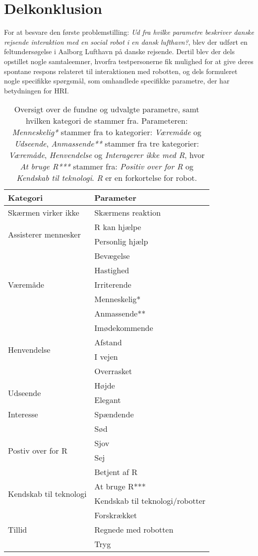 \chapter{Delkonklusion}
\label{ParametreDelKonklusion}
%
For at besvare den første problemstilling: \textit{Ud fra hvilke parametre beskriver danske rejsende interaktion med en social robot i en dansk lufthavn?}, blev der udført en feltundersøgelse i Aalborg Lufthavn på danske rejsende. Dertil blev der dels opstillet nogle samtaleemner, hvorfra testpersonerne fik mulighed for at give deres spontane respons relateret til interaktionen med robotten, og dels formuleret nogle specifikke spørgsmål, som omhandlede specifikke parametre, der har betydningen for HRI. 
%
\begin{table}[H]
\centering
\begin{tabular}{ l|l }
\centering
Kategori & Parameter\\ \hline
Skærmen virker ikke & Skærmens reaktion\\ \hline
\multirow{2}{*}{Assisterer mennesker} & R kan hjælpe \\
 & Personlig hjælp \\ \hline
\multirow{5}{*}{Væremåde} & Bevægelse \\
 & Hastighed \\
 & Irriterende \\
 & Menneskelig* \\
 & Anmassende** \\ \hline
\multirow{4}{*}{Henvendelse} & Imødekommende \\
 & Afstand \\
 & I vejen \\
 & Overrasket\\ \hline
 \multirow{2}{*}{Udseende} & Højde \\
 & Elegant \\ \hline
 Interesse & Spændende\\ \hline
 \multirow{4}{*}{Postiv over for R} & Sød \\
 & Sjov \\
 & Sej \\
 & Betjent af R\\ \hline
  \multirow{2}{*}{Kendskab til teknologi} & At bruge R*** \\
 & Kendskab til teknologi/robotter \\ \hline
  \multirow{3}{*}{Tillid} & Forskrækket \\
 & Regnede med robotten \\
 & Tryg
\end{tabular}
\caption{Oversigt over de fundne og udvalgte parametre, samt hvilken kategori de stammer fra. Parameteren: \textit{Menneskelig*} stammer fra to kategorier: \textit{Væremåde} og \textit{Udseende}, \textit{Anmassende**} stammer fra tre kategorier: \textit{Væremåde}, \textit{Henvendelse} og \textit{Interagerer ikke med R}, hvor \textit{At bruge R***} stammer fra: \textit{Positiv over for R} og \textit{Kendskab til teknologi}. \textit{R} er en forkortelse for robot.}
\label{tab:OversigtOverValgteParametre}
\end{table}
